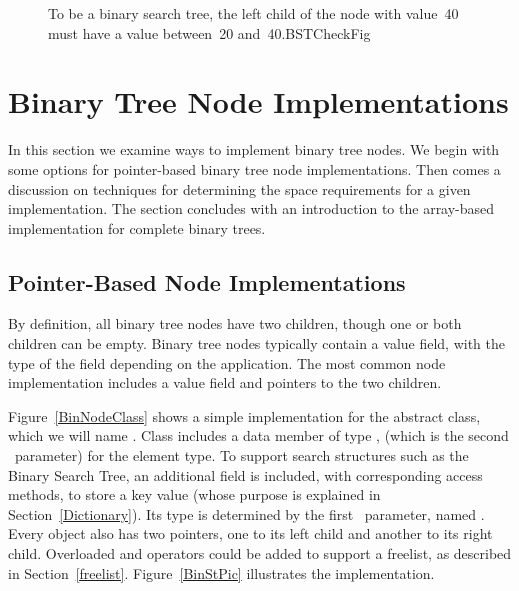\begin{figure}
{To be a binary search tree, the left child of the node with value~40
must have a value between~20 and~40.}{BSTCheckFig}
\end{figure}




\section{Binary Tree Node Implementations}
\label{BTImpl}

In this section we examine ways to implement binary tree nodes.
We begin with some options for pointer-based
binary tree node implementations.
Then comes a discussion on techniques for determining the space
requirements for a given
implementation. 
The section concludes with an introduction to the 
array-based implementation for complete binary trees.

\subsection{Pointer-Based Node Implementations}
\label{PointerBin}

By definition, all binary tree nodes have two children,
though one or both children can be empty.
Binary tree nodes typically contain a value field,
with the type of the field depending on the application.
The most common node implementation includes a value field and
pointers to the two children.

Figure~\ref{BinNodeClass} shows a simple implementation for the
 abstract class, which we will name .
Class  includes a data member of type ,
(which is the second \Gen\ parameter) for the element type.
To support search structures such as the Binary Search Tree, an
additional field is included, with corresponding access methods,
to store a key value
(whose purpose is explained in Section~\ref{Dictionary}).
Its type is determined by the first \Gen\ parameter, named
.
Every  object also has two pointers,
one to its left child and another to its right child.
{Overloaded  and  operators could be added to
support a freelist,
as described in Section~\ref{freelist}.}
{}Figure~\ref{BinStPic}
illustrates the  implementation.

